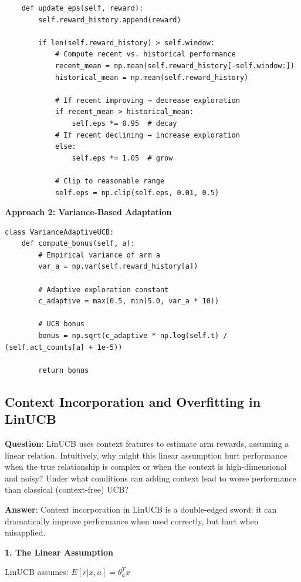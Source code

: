 \documentclass[12pt]{article}
\begin{document}
{{{\begin{verbatim}
    def update_eps(self, reward):
        self.reward_history.append(reward)

        if len(self.reward_history) > self.window:
            # Compute recent vs. historical performance
            recent_mean = np.mean(self.reward_history[-self.window:])
            historical_mean = np.mean(self.reward_history)

            # If recent improving → decrease exploration
            if recent_mean > historical_mean:
                self.eps *= 0.95  # decay
            # If recent declining → increase exploration
            else:
                self.eps *= 1.05  # grow

            # Clip to reasonable range
            self.eps = np.clip(self.eps, 0.01, 0.5)
\end{verbatim}

\textbf{Approach 2: Variance-Based Adaptation}

\begin{verbatim}
class VarianceAdaptiveUCB:
    def compute_bonus(self, a):
        # Empirical variance of arm a
        var_a = np.var(self.reward_history[a])

        # Adaptive exploration constant
        c_adaptive = max(0.5, min(5.0, var_a * 10))

        # UCB bonus
        bonus = np.sqrt(c_adaptive * np.log(self.t) / (self.act_counts[a] + 1e-5))

        return bonus
\end{verbatim}

\subsection{Context Incorporation and Overfitting in LinUCB}

\textbf{Question}: LinUCB uses context features to estimate arm rewards, assuming a linear relation. Intuitively, why might this linear assumption hurt performance when the true relationship is complex or when the context is high-dimensional and noisy? Under what conditions can adding context lead to worse performance than classical (context-free) UCB?

\textbf{Answer}: Context incorporation in LinUCB is a double-edged sword: it can dramatically improve performance when used correctly, but hurt when misapplied.

\textbf{1. The Linear Assumption}

LinUCB assumes: $E[r | x, a] = \theta_a^T x$

}}}
\end{document}
